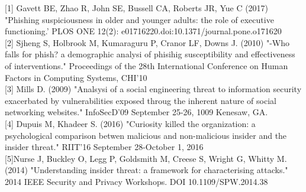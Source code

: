 \documentclass[12pt]{article}
\begin{document}
{[1]} Gavett BE, Zhao R, John SE, Bussell CA, Roberts JR, Yue C (2017) "Phishing suspiciousness in older and younger adults: the role of executive functioning.' PLOS ONE 12(2): e01716220.doi:10.1371/journal.pone.o171620
\\
{[2]} Sjheng S, Holbrook M, Kumaraguru P, Cranor LF, Downs J. (2010) "-Who falls for phish? a demographic analysi of phisihig susceptibility and effectiveness of interventions." Proceedings of the 28th International Conference on Human Factors in Computing Systems, CHI'10
\\
{[3]} Mills D. (2009) "Analsysi of a social engineering threat to information security exacerbated by vulnerabilities exposed throug the inherent nature of social networking websites." InfoSecD'09 September 25-26, 1009 Kenesaw, GA. 
\\
{[4]} Dupuis M, Khadeer S. (2016) "Curiosity killed the organization: a psychological comparison betwen malicious and non-malicious insider and the insider threat." RIIT'16 September 28-October 1, 2016 
\\
{[5]}Nurse J, Buckley O, Legg P, Goldsmith M, Creese S, Wright G, Whitty M. (2014) "Understanding insider threat: a framework for characterising attacks." 2014 IEEE Security and Privacy Workshops. DOI 10.1109/SPW.2014.38
\end{document}
